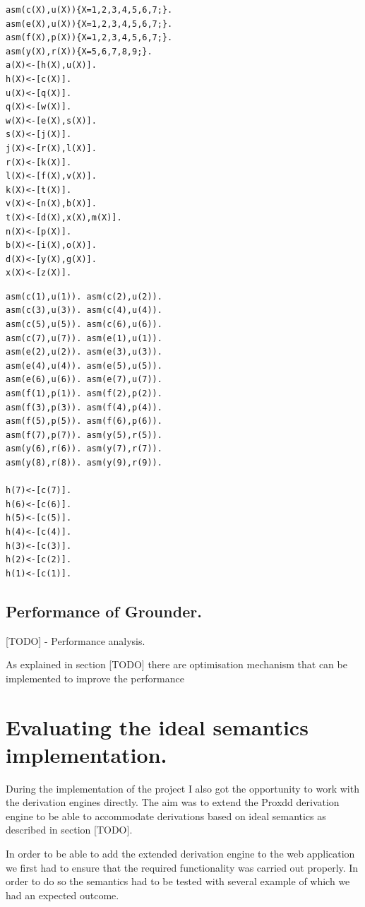 \begin{Verbatim}[frame=single]
asm(c(X),u(X)){X=1,2,3,4,5,6,7;}.
asm(e(X),u(X)){X=1,2,3,4,5,6,7;}.
asm(f(X),p(X)){X=1,2,3,4,5,6,7;}.
asm(y(X),r(X)){X=5,6,7,8,9;}.
a(X)<-[h(X),u(X)].
h(X)<-[c(X)].
u(X)<-[q(X)].
q(X)<-[w(X)].
w(X)<-[e(X),s(X)].
s(X)<-[j(X)].
j(X)<-[r(X),l(X)].
r(X)<-[k(X)].
l(X)<-[f(X),v(X)].
k(X)<-[t(X)].
v(X)<-[n(X),b(X)].
t(X)<-[d(X),x(X),m(X)].
n(X)<-[p(X)].
b(X)<-[i(X),o(X)].
d(X)<-[y(X),g(X)].
x(X)<-[z(X)].

\end{Verbatim}

\begin{Verbatim}[frame=single]
asm(c(1),u(1)).	asm(c(2),u(2)).
asm(c(3),u(3)).	asm(c(4),u(4)).
asm(c(5),u(5)).	asm(c(6),u(6)).
asm(c(7),u(7)).	asm(e(1),u(1)).
asm(e(2),u(2)).	asm(e(3),u(3)).
asm(e(4),u(4)).	asm(e(5),u(5)).
asm(e(6),u(6)).	asm(e(7),u(7)).
asm(f(1),p(1)).	asm(f(2),p(2)).
asm(f(3),p(3)).	asm(f(4),p(4)).
asm(f(5),p(5)).	asm(f(6),p(6)).
asm(f(7),p(7)).	asm(y(5),r(5)).
asm(y(6),r(6)).	asm(y(7),r(7)).
asm(y(8),r(8)).	asm(y(9),r(9)).

h(7)<-[c(7)].
h(6)<-[c(6)].
h(5)<-[c(5)].
h(4)<-[c(4)].
h(3)<-[c(3)].
h(2)<-[c(2)].
h(1)<-[c(1)].
\end{Verbatim}


\subsection{Performance of Grounder.}

[TODO] - Performance analysis.

As explained in section [TODO] there are optimisation mechanism that can be implemented to improve the performance

\section{Evaluating the ideal semantics implementation.}
During the implementation of the project I also got the opportunity to work with the derivation engines directly. The aim was to extend the Proxdd derivation engine to be able to accommodate derivations based on ideal semantics as described in section [TODO].

In order to be able to add the extended derivation engine to the web application we first had to ensure that the required functionality was carried out properly. In order to do so the semantics had to be tested with several example of which we had an expected outcome.

